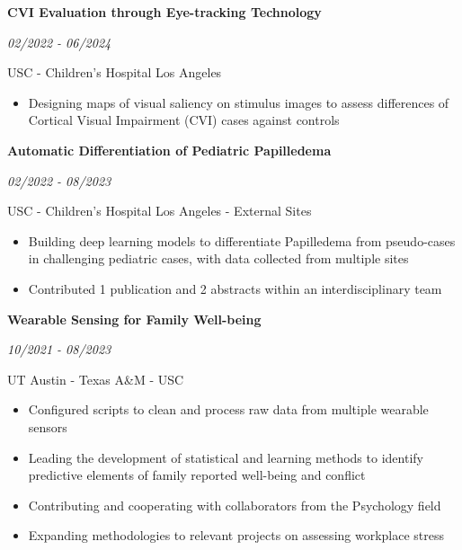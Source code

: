 \documentclass[margin]{res}
\newcommand{\cvheading}[2]{%
  \par\Needspace{4\baselineskip}\noindent
  \parbox[t]{\dimexpr\linewidth-110pt\relax}{\raggedright\bfseries #1}%
  \hfill\parbox[t]{98pt}{\raggedleft\itshape #2}%
  \par\nopagebreak[4]\vspace{-\parskip}\noindent\ignorespaces}
\begin{document}
\begin{resume}
\vspace{-1mm}
\cvheading{CVI Evaluation through Eye-tracking Technology}{02/2022 - 06/2024}
USC - Children's Hospital Los Angeles
\vspace{1mm}
\begin{itemize}
    \item Designing maps of visual saliency on stimulus images to assess differences of Cortical Visual Impairment (CVI) cases against controls%
\end{itemize}

\vspace{-1mm}
\cvheading{Automatic Differentiation of Pediatric Papilledema}{02/2022 - 08/2023}
USC - Children's Hospital Los Angeles - External Sites
\vspace{1mm}
\begin{itemize}
    \item Building deep learning models to differentiate Papilledema from pseudo-cases \\ in challenging pediatric cases, with data collected from multiple sites
    \vspace{-1mm}
    \item Contributed 1 publication and 2 abstracts within an interdisciplinary team%
\end{itemize}

\cvheading{Wearable Sensing for Family Well-being}{10/2021 - 08/2023}
UT Austin - Texas A\&M - USC
\vspace{1mm}
\begin{itemize}
    \item Configured scripts to clean and process raw data from multiple wearable sensors
    \vspace{-1mm}
    \item Leading the development of statistical and learning methods to identify predictive elements of family reported well-being and conflict%
    \vspace{-1mm}
    \item Contributing and cooperating with collaborators from the Psychology field
    \vspace{-1mm}
    \item Expanding methodologies to relevant projects on assessing workplace stress
\end{itemize}


\end{resume}
\end{document}
